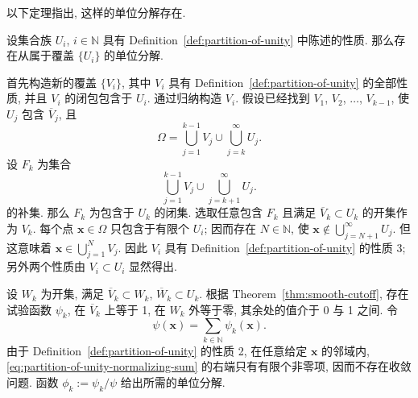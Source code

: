 以下定理指出, 这样的单位分解存在.

\begin{Theorem}
\label{thm:partition-of-unity-existence}
设集合族 $U_i$, $i\in\mathbb{N}$ 具有 Definition~\ref{def:partition-of-unity} 中陈述的性质. 那么存在从属于覆盖 $\{U_i\}$ 的单位分解.
\end{Theorem}

\begin{Proof}
首先构造新的覆盖 $\{V_i\}$, 其中 $V_i$ 具有 Definition~\ref{def:partition-of-unity} 的全部性质, 并且 $V_i$ 的闭包包含于 $U_i$. 通过归纳构造 $V_i$. 假设已经找到 $V_1$, $V_2$, $\ldots$, $V_{k-1}$, 使 $U_j$ 包含 $\overline V_j$, 且
\begin{equation}\label{eq:shrinking-cover-inductive-invariant}
\Omega=\bigcup_{j=1}^{k-1}V_j\cup\bigcup_{j=k}^\infty U_j.
\end{equation}
设 $F_k$ 为集合
\begin{equation}\label{eq:shrinking-cover-complement-set}
\bigcup_{j=1}^{k-1}V_j\cup\bigcup_{j=k+1}^\infty U_j.
\end{equation}
的补集. 那么 $F_k$ 为包含于 $U_k$ 的闭集. 选取任意包含 $F_k$ 且满足 $\overline V_k\subset U_k$ 的开集作为 $V_k$. 每个点 $\bm{x}\in\Omega$ 只包含于有限个 $U_i$; 因而存在 $N\in\mathbb{N}$, 使 $\bm{x}\notin\bigcup_{j=N+1}^\infty U_j$. 但这意味着 $\bm{x}\in\bigcup_{j=1}^NV_j$. 因此 $V_i$ 具有 Definition~\ref{def:partition-of-unity} 的性质 3; 另外两个性质由 $V_i\subset U_i$ 显然得出.

设 $W_k$ 为开集, 满足 $\overline V_k\subset W_k$, $\overline W_k\subset U_k$. 根据 Theorem~\ref{thm:smooth-cutoff}, 存在试验函数 $\psi_k$, 在 $\overline V_k$ 上等于 1, 在 $W_k$ 外等于零, 其余处的值介于 0 与 1 之间. 令
\begin{equation}\label{eq:partition-of-unity-normalizing-sum}
\psi(\bm{x})=\sum_{k\in\mathbb{N}}\psi_k(\bm{x}).
\end{equation}
由于 Definition~\ref{def:partition-of-unity} 的性质 2, 在任意给定 $\bm{x}$ 的邻域内, \eqref{eq:partition-of-unity-normalizing-sum} 的右端只有有限个非零项, 因而不存在收敛问题. 函数 $\phi_k:=\psi_k/\psi$ 给出所需的单位分解.
\end{Proof}
